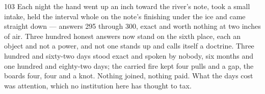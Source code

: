 \begin{CRchronicle}{103}
Each night the hand went up an inch toward the river’s note, took a small intake, held the interval whole on the note’s finishing under the ice and came straight down --- answers 295 through 300, exact and worth nothing at two inches of air. Three hundred honest answers now stand on the sixth place, each an object and not a power, and not one stands up and calls itself a doctrine. Three hundred and sixty-two days stood exact and spoken by nobody, six months and one hundred and eighty-two days; the carried fire kept four pulls and a gap, the boards four, four and a knot. Nothing joined, nothing paid. What the days cost was attention, which no institution here has thought to tax.
\end{CRchronicle}
